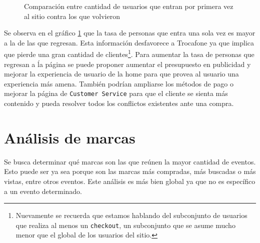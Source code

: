 \documentclass[a4paper]{article}
\begin{document}
\begin{figure}[!h]
	\caption{Comparación entre cantidad de usuarios que entran por primera vez al sitio contra los que volvieron}
	\label{fig:newvsreturning}
\end{figure}

Se observa en el gráfico \ref{fig:newvsreturning} que la tasa de personas que entra una sola vez es mayor a la de las que regresan. Esta información desfavorece a Trocafone ya que implica que pierde una gran cantidad de clientes\footnote{Nuevamente se recuerda que estamos hablando del subconjunto de usuarios que realiza al menos un \texttt{checkout}, un subconjunto que se asume mucho menor que el global de los usuarios del sitio.}. Para aumentar la tasa de personas que regresan a ĺa página se puede proponer aumentar el presupuesto en publicidad y mejorar la experiencia de usuario de la home para que provea al usuario una experiencia más amena. También podrían ampliarse los métodos de pago o mejorar la página de \texttt{Customer Service} para que el cliente se sienta más contenido y pueda resolver todos los conflictos existentes ante una compra.

\section{Análisis de marcas}

Se busca determinar qué marcas son las que reúnen la mayor cantidad de eventos. Esto puede ser ya sea porque son las marcas más compradas, más buscadas o más vistas, entre otros eventos. Este análisis es más bien global ya que no es específico a un evento determinado.
\end{document}
